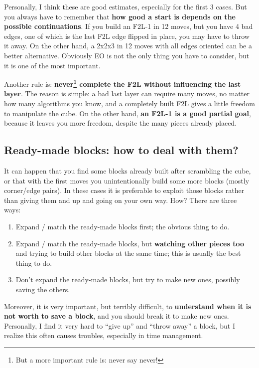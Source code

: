 \documentclass[11pt,a4paper]{book}
\begin{document}
Personally, I think these are good estimates, especially for the first 3 cases. But you always have to remember that \textbf{how good a start is depends on the possible continuations}. If you build an F2L-1 in 12 moves, but you have 4 bad edges, one of which is the last F2L edge flipped in place, you may have to throw it away. On the other hand, a 2x2x3 in 12 moves with all edges oriented can be a better alternative. Obviously EO is not the only thing you have to consider, but it is one of the most important.

Another rule is: \textbf{never\footnote{But a more important rule is: never say never!} complete the F2L without influencing the last layer}. The reason is simple: a bad last layer can require many moves, no matter how many algorithms you know, and a completely built F2L gives a little freedom to manipulate the cube. On the other hand, \textbf{an F2L-1 is a good partial goal}, because it leaves you more freedom, despite the many pieces already placed.

\subsection{Ready-made blocks: how to deal with them?}
\label{ready-made}

It can happen that you find some blocks already built after scrambling the cube, or that with the first moves you unintentionally build some more blocks (mostly corner/edge pairs). In these cases it is preferable to exploit those blocks rather than giving them and up and going on your own way. How? There are three ways:

\begin{enumerate}
\item Expand / match the ready-made blocks first; the obvious thing to do.
\item Expand / match the ready-made blocks, but \textbf{watching other pieces too} and trying to build other blocks at the same time; this is usually the best thing to do.
\item Don't expand the ready-made blocks, but try to make new ones, possibly saving the others.
\end{enumerate}

Moreover, it is very important, but terribly difficult, to \textbf{understand when it is not worth to save a block}, and you should break it to make new ones. Personally, I find it very hard to ``give up'' and ``throw away'' a block, but I realize this often causes troubles, especially in time management.
\end{document}
